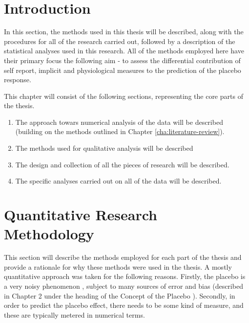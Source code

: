 
\section{Introduction}

In this section, the methods used in this thesis will be described, along with the procedures for all of the research carried out, followed by a description of the statistical analyses used in this research.
All of the methods employed here have their primary focus the following aim - to assess the differential contribution of self report, implicit and physiological measures to the prediction of the placebo response.

This chapter will consist of the following sections, representing the core parts of the thesis.

\begin{enumerate}
\item The approach towars numerical analysis of the data will be described (building on the methods outlined in Chapter \ref{cha:literature-review}). 
\item The methods used for qualitative analysis will be described
\item  The design and collection of all the pieces of research will be described.
\item The specific analyses carried out on all of the data will be described.
\end{enumerate}

\section{Quantitative Research Methodology}
\label{sec:quant-rese-meth}
This section  will describe the methods employed for each part of the thesis and provide a rationale for why these methods were used in the thesis.
A mostly quantitative approach was taken for the following reasons. Firstly, the placebo  is a very noisy phenomenon \cite{Singer2005}, subject to many sources of error and bias (described in Chapter 2 under the heading of the Concept of the Placebo ). Secondly, in order to predict the placebo effect, there needs to be some kind of measure, and these are typically metered in numerical terms. 

